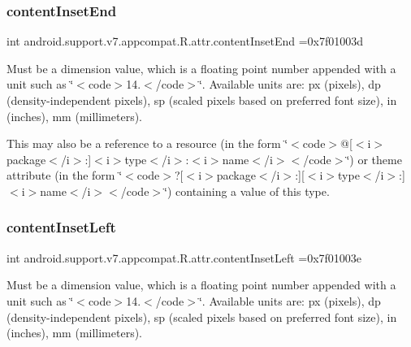 \subsubsection{\texorpdfstring{content\+Inset\+End}{contentInsetEnd}}
{\footnotesize\ttfamily int android.\+support.\+v7.\+appcompat.\+R.\+attr.\+content\+Inset\+End =0x7f01003d\hspace{0.3cm}{\ttfamily [static]}}

Must be a dimension value, which is a floating point number appended with a unit such as \char`\"{}$<$code$>$14.\+5sp$<$/code$>$\char`\"{}. Available units are\+: px (pixels), dp (density-\/independent pixels), sp (scaled pixels based on preferred font size), in (inches), mm (millimeters). 

This may also be a reference to a resource (in the form \char`\"{}$<$code$>$@\mbox{[}$<$i$>$package$<$/i$>$\+:\mbox{]}$<$i$>$type$<$/i$>$\+:$<$i$>$name$<$/i$>$$<$/code$>$\char`\"{}) or theme attribute (in the form \char`\"{}$<$code$>$?\mbox{[}$<$i$>$package$<$/i$>$\+:\mbox{]}\mbox{[}$<$i$>$type$<$/i$>$\+:\mbox{]}$<$i$>$name$<$/i$>$$<$/code$>$\char`\"{}) containing a value of this type. \mbox{\label{classandroid_1_1support_1_1v7_1_1appcompat_1_1R_1_1attr_a53c50cac162dcc7adf7d93be2d2bce5c}} 
\subsubsection{\texorpdfstring{content\+Inset\+Left}{contentInsetLeft}}
{\footnotesize\ttfamily int android.\+support.\+v7.\+appcompat.\+R.\+attr.\+content\+Inset\+Left =0x7f01003e\hspace{0.3cm}{\ttfamily [static]}}

Must be a dimension value, which is a floating point number appended with a unit such as \char`\"{}$<$code$>$14.\+5sp$<$/code$>$\char`\"{}. Available units are\+: px (pixels), dp (density-\/independent pixels), sp (scaled pixels based on preferred font size), in (inches), mm (millimeters). 

